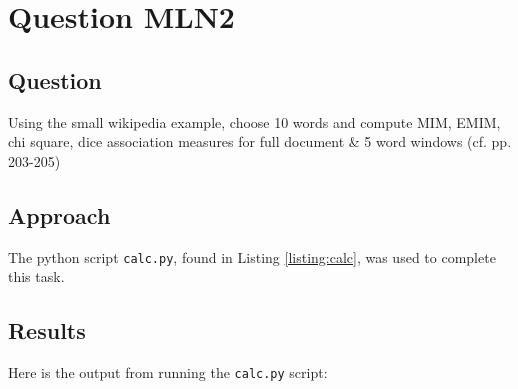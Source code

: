 \section{Question MLN2}

\subsection{Question}
Using the small wikipedia example, choose 10 words and compute MIM, EMIM, chi square, dice association measures for full document \& 5 word windows (cf. pp. 203-205)

\subsection{Approach}
The python script \texttt{calc.py}, found in Listing \ref{listing:calc}, was used to complete this task.

\subsection{Results}
Here is the output from running the \texttt{calc.py} script:


